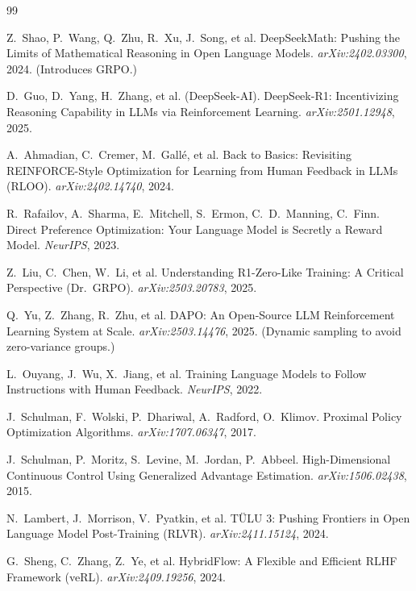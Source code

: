 \begin{thebibliography}{99}
\small

Z.~Shao, P.~Wang, Q.~Zhu, R.~Xu, J.~Song, et al.
\newblock DeepSeekMath: Pushing the Limits of Mathematical Reasoning in Open Language Models.
\newblock \emph{arXiv:2402.03300}, 2024. (Introduces GRPO.)

D.~Guo, D.~Yang, H.~Zhang, et al. (DeepSeek-AI).
\newblock DeepSeek-R1: Incentivizing Reasoning Capability in LLMs via Reinforcement Learning.
\newblock \emph{arXiv:2501.12948}, 2025.

A.~Ahmadian, C.~Cremer, M.~Gall\'e, et al.
\newblock Back to Basics: Revisiting REINFORCE-Style Optimization for Learning from Human Feedback in LLMs (RLOO).
\newblock \emph{arXiv:2402.14740}, 2024.

R.~Rafailov, A.~Sharma, E.~Mitchell, S.~Ermon, C.~D.~Manning, C.~Finn.
\newblock Direct Preference Optimization: Your Language Model is Secretly a Reward Model.
\newblock \emph{NeurIPS}, 2023.

Z.~Liu, C.~Chen, W.~Li, et al.
\newblock Understanding R1-Zero-Like Training: A Critical Perspective (Dr.\ GRPO).
\newblock \emph{arXiv:2503.20783}, 2025.

Q.~Yu, Z.~Zhang, R.~Zhu, et al.
\newblock DAPO: An Open-Source LLM Reinforcement Learning System at Scale.
\newblock \emph{arXiv:2503.14476}, 2025. (Dynamic sampling to avoid zero-variance groups.)

L.~Ouyang, J.~Wu, X.~Jiang, et al.
\newblock Training Language Models to Follow Instructions with Human Feedback.
\newblock \emph{NeurIPS}, 2022.

J.~Schulman, F.~Wolski, P.~Dhariwal, A.~Radford, O.~Klimov.
\newblock Proximal Policy Optimization Algorithms.
\newblock \emph{arXiv:1707.06347}, 2017.

J.~Schulman, P.~Moritz, S.~Levine, M.~Jordan, P.~Abbeel.
\newblock High-Dimensional Continuous Control Using Generalized Advantage Estimation.
\newblock \emph{arXiv:1506.02438}, 2015.

N.~Lambert, J.~Morrison, V.~Pyatkin, et al.
\newblock T\"ULU 3: Pushing Frontiers in Open Language Model Post-Training (RLVR).
\newblock \emph{arXiv:2411.15124}, 2024.

G.~Sheng, C.~Zhang, Z.~Ye, et al.
\newblock HybridFlow: A Flexible and Efficient RLHF Framework (veRL).
\newblock \emph{arXiv:2409.19256}, 2024.


\end{thebibliography}
